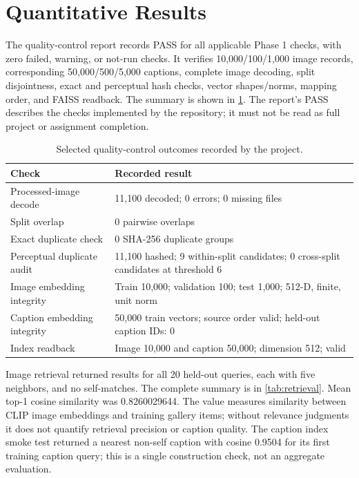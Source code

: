 \section{Quantitative Results}\label{ch:results}
The quality-control report records PASS for all applicable Phase 1 checks, with zero failed, warning, or not-run checks. It verifies 10,000/100/1,000 image records, corresponding 50,000/500/5,000 captions, complete image decoding, split disjointness, exact and perceptual hash checks, vector shapes/norms, mapping order, and FAISS readback. The summary is shown in \cref{tab:qc}. The report's PASS describes the checks implemented by the repository; it must not be read as full project or assignment completion.

\begin{table}[htbp]\centering\caption{Selected quality-control outcomes recorded by the project.}\label{tab:qc}
\begin{tabularx}{\textwidth}{lX}\toprule Check & Recorded result\\\midrule Processed-image decode & 11,100 decoded; 0 errors; 0 missing files\\Split overlap & 0 pairwise overlaps\\Exact duplicate check & 0 SHA-256 duplicate groups\\Perceptual duplicate audit & 11,100 hashed; 9 within-split candidates; 0 cross-split candidates at threshold 6\\Image embedding integrity & Train 10,000; validation 100; test 1,000; 512-D, finite, unit norm\\Caption embedding integrity & 50,000 train vectors; source order valid; held-out caption IDs: 0\\Index readback & Image 10,000 and caption 50,000; dimension 512; valid\\\bottomrule\end{tabularx}\end{table}

Image retrieval returned results for all 20 held-out queries, each with five neighbors, and no self-matches. The complete summary is in \cref{tab:retrieval}. Mean top-1 cosine similarity was 0.8260029644. The value measures similarity between CLIP image embeddings and training gallery items; without relevance judgments it does not quantify retrieval precision or caption quality. The caption index smoke test returned a nearest non-self caption with cosine 0.9504 for its first training caption query; this is a single construction check, not an aggregate evaluation.

